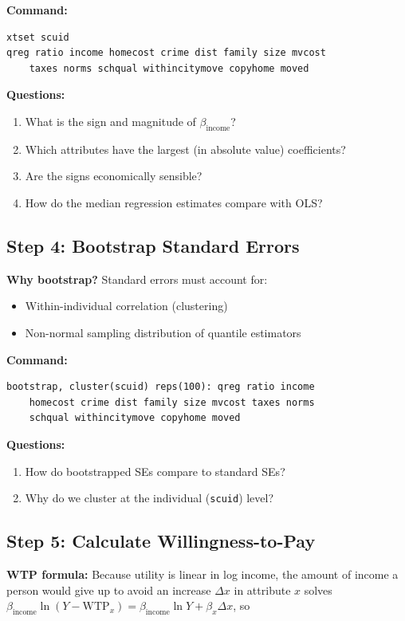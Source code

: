\documentclass[12pt]{article}
\begin{document}
\textbf{Command:}
\begin{verbatim}
xtset scuid
qreg ratio income homecost crime dist family size mvcost 
    taxes norms schqual withincitymove copyhome moved
\end{verbatim}

\textbf{Questions:}
\begin{enumerate}
    \item What is the sign and magnitude of $\beta_{\text{income}}$?
    \item Which attributes have the largest (in absolute value) coefficients?
    \item Are the signs economically sensible?
    \item How do the median regression estimates compare with OLS?
\end{enumerate}

\subsection{Step 4: Bootstrap Standard Errors}

\textbf{Why bootstrap?} Standard errors must account for:
\begin{itemize}
    \item Within-individual correlation (clustering)
    \item Non-normal sampling distribution of quantile estimators
\end{itemize}

\textbf{Command:}
\begin{verbatim}
bootstrap, cluster(scuid) reps(100): qreg ratio income 
    homecost crime dist family size mvcost taxes norms 
    schqual withincitymove copyhome moved
\end{verbatim}

\textbf{Questions:}
\begin{enumerate}
    \item How do bootstrapped SEs compare to standard SEs?
    \item Why do we cluster at the individual (\texttt{scuid}) level?
\end{enumerate}

\subsection{Step 5: Calculate Willingness-to-Pay}

\textbf{WTP formula:} Because utility is linear in log income, the amount of income a person would give up to avoid an increase $\Delta x$ in attribute $x$ solves $\beta_{\text{income}}\ln(Y-\text{WTP}_x) = \beta_{\text{income}}\ln Y + \beta_x\Delta x$, so
\end{document}
